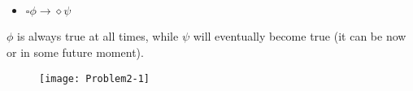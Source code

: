 \subsection{}

\begin{itemize}
   \item[] $\square \phi \rightarrow \diamond \psi$ 
\end{itemize}

\indent $\phi$ is always true at all times, while $\psi$ will eventually become true (it can be now or in some future moment).

\begin{figure}[h!]
	\centering \texttt{[image: Problem2-1]}
\end{figure}


